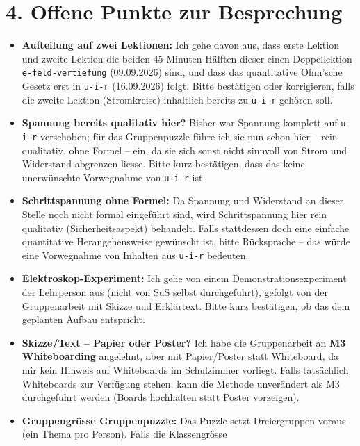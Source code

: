 \documentclass[11pt,a4paper]{article}
\newcommand{\Methode}[1]{{\small\color{groupteal}\textbf{#1}}}
\begin{document}
\section*{4. Offene Punkte zur Besprechung}

\begin{itemize}[leftmargin=1.2cm,itemsep=0.4em]
  \item \textbf{Aufteilung auf zwei Lektionen:} Ich gehe davon aus, dass
  \glqq erste Lektion\grqq{} und \glqq zweite Lektion\grqq{} die beiden
  45-Minuten-Hälften dieser einen Doppellektion \texttt{e-feld-vertiefung}
  (09.09.2026) sind, und dass das quantitative Ohm'sche Gesetz erst in
  \texttt{u-i-r} (16.09.2026) folgt. Bitte bestätigen oder korrigieren,
  falls die zweite Lektion (Stromkreise) inhaltlich bereits zu
  \texttt{u-i-r} gehören soll.
  \item \textbf{Spannung bereits qualitativ hier?} Bisher war Spannung
  komplett auf \texttt{u-i-r} verschoben; für das Gruppenpuzzle führe ich
  sie nun schon hier -- rein qualitativ, ohne Formel -- ein, da sie sich
  sonst nicht sinnvoll von Strom und Widerstand abgrenzen liesse. Bitte
  kurz bestätigen, dass das keine unerwünschte Vorwegnahme von
  \texttt{u-i-r} ist.
  \item \textbf{Schrittspannung ohne Formel:} Da Spannung und Widerstand
  an dieser Stelle noch nicht formal eingeführt sind, wird Schrittspannung
  hier rein qualitativ (Sicherheitsaspekt) behandelt. Falls stattdessen
  doch eine einfache quantitative Herangehensweise gewünscht ist, bitte
  Rücksprache -- das würde eine Vorwegnahme von Inhalten aus
  \texttt{u-i-r} bedeuten.
  \item \textbf{Elektroskop-Experiment:} Ich gehe von einem
  Demonstrationsexperiment der Lehrperson aus (nicht von SuS selbst
  durchgeführt), gefolgt von der Gruppenarbeit mit Skizze und Erklärtext.
  Bitte kurz bestätigen, ob das dem geplanten Aufbau entspricht.
  \item \textbf{Skizze/Text -- Papier oder Poster?} Ich habe die
  Gruppenarbeit an \Methode{M3 Whiteboarding} angelehnt, aber mit
  Papier/Poster statt Whiteboard, da mir kein Hinweis auf Whiteboards im
  Schulzimmer vorliegt. Falls tatsächlich Whiteboards zur Verfügung
  stehen, kann die Methode unverändert als M3 durchgeführt werden
  (Boards hochhalten statt Poster vorzeigen).
  \item \textbf{Gruppengrösse Gruppenpuzzle:} Das Puzzle setzt
  Dreiergruppen voraus (ein Thema pro Person). Falls die Klassengrösse

\end{itemize}
\end{document}
